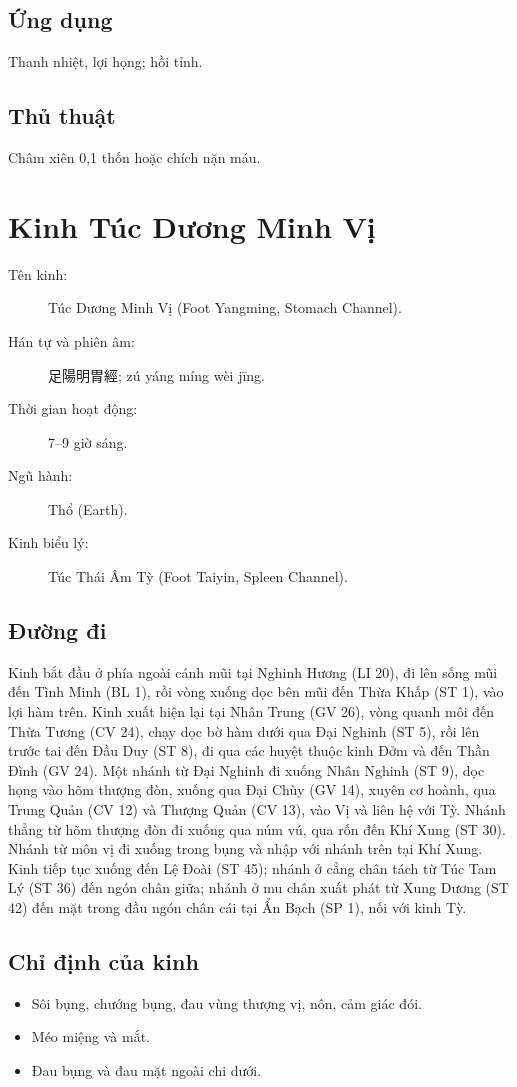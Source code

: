 \documentclass[12pt,a4paper]{article}
\begin{document}
\subsection*{Ứng dụng}Thanh nhiệt, lợi họng; hồi tỉnh.
\subsection*{Thủ thuật}Châm xiên 0{,}1 thốn hoặc chích nặn máu.

\clearpage
\section{Kinh Túc Dương Minh Vị}
\begin{description}
\item[Tên kinh:] Túc Dương Minh Vị (Foot Yangming, Stomach Channel).
\item[Hán tự và phiên âm:] 足陽明胃經; zú yáng míng wèi jīng.
\item[Thời gian hoạt động:] 7--9 giờ sáng.
\item[Ngũ hành:] Thổ (Earth).
\item[Kinh biểu lý:] Túc Thái Âm Tỳ (Foot Taiyin, Spleen Channel).
\end{description}
\subsection*{Đường đi}
Kinh bắt đầu ở phía ngoài cánh mũi tại Nghinh Hương (LI 20), đi lên sống mũi đến Tình Minh (BL 1), rồi vòng xuống dọc bên mũi đến Thừa Khấp (ST 1), vào lợi hàm trên. Kinh xuất hiện lại tại Nhân Trung (GV 26), vòng quanh môi đến Thừa Tương (CV 24), chạy dọc bờ hàm dưới qua Đại Nghinh (ST 5), rồi lên trước tai đến Đầu Duy (ST 8), đi qua các huyệt thuộc kinh Đởm và đến Thần Đình (GV 24). Một nhánh từ Đại Nghinh đi xuống Nhân Nghinh (ST 9), dọc họng vào hõm thượng đòn, xuống qua Đại Chùy (GV 14), xuyên cơ hoành, qua Trung Quản (CV 12) và Thượng Quản (CV 13), vào Vị và liên hệ với Tỳ. Nhánh thẳng từ hõm thượng đòn đi xuống qua núm vú, qua rốn đến Khí Xung (ST 30). Nhánh từ môn vị đi xuống trong bụng và nhập với nhánh trên tại Khí Xung. Kinh tiếp tục xuống đến Lệ Đoài (ST 45); nhánh ở cẳng chân tách từ Túc Tam Lý (ST 36) đến ngón chân giữa; nhánh ở mu chân xuất phát từ Xung Dương (ST 42) đến mặt trong đầu ngón chân cái tại Ẩn Bạch (SP 1), nối với kinh Tỳ.
\subsection*{Chỉ định của kinh}
\begin{itemize}\item Sôi bụng, chướng bụng, đau vùng thượng vị, nôn, cảm giác đói.\item Méo miệng và mắt.\item Đau bụng và đau mặt ngoài chi dưới.\end{itemize}
\end{document}
